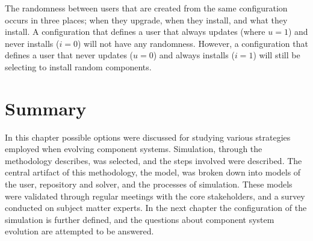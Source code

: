 The randomness between users that are created from the same configuration occurs in three places;
when they upgrade, when they install, and what they install.
A configuration that defines a user that always updates (where $u = 1$) and never installs ($i = 0$) will not have any randomness.
However, a configuration that defines a user that never updates ($u = 0$) and always installs ($i = 1$) will still be selecting to install random components.


\section{Summary}
{}In this chapter possible options were discussed for studying various strategies employed when evolving component systems.
{}Simulation, through the methodology \citep{Law2005} describes, was selected, and the steps involved were described.
{}The central artifact of this methodology, the \usermodel model, was broken down into models of the user, repository and solver, and the processes of simulation.
{}These models were validated through regular meetings with the core stakeholders, and a survey conducted on subject matter experts.
{}In the next chapter the configuration of the simulation is further defined, and the questions about component system evolution are attempted to be answered.
